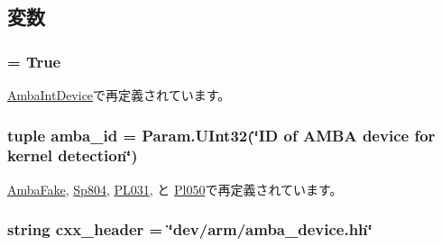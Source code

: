 \subsection{変数}
\hypertarget{classRealView_1_1AmbaPioDevice_a17fa61ac3806b481cafee5593b55e5d0}{
\subsubsection[{abstract}]{ = True}}
\label{classRealView_1_1AmbaPioDevice_a17fa61ac3806b481cafee5593b55e5d0}


\hyperlink{classRealView_1_1AmbaIntDevice_a17fa61ac3806b481cafee5593b55e5d0}{AmbaIntDevice}で再定義されています。\hypertarget{classRealView_1_1AmbaPioDevice_ad9d2b9e37de5c1c7c10219fc1b834599}{
\subsubsection[{amba\_\-id}]{\setlength{\rightskip}{0pt plus 5cm}tuple {\bf amba\_\-id} = Param.UInt32(\char`\"{}ID of AMBA device for kernel detection\char`\"{})}}
\label{classRealView_1_1AmbaPioDevice_ad9d2b9e37de5c1c7c10219fc1b834599}


\hyperlink{classRealView_1_1AmbaFake_a38d7b9edfe6f0eea7a54e7e4f6253f3a}{AmbaFake}, \hyperlink{classRealView_1_1Sp804_a38d7b9edfe6f0eea7a54e7e4f6253f3a}{Sp804}, \hyperlink{classRealView_1_1PL031_a38d7b9edfe6f0eea7a54e7e4f6253f3a}{PL031}, と \hyperlink{classRealView_1_1Pl050_a38d7b9edfe6f0eea7a54e7e4f6253f3a}{Pl050}で再定義されています。\hypertarget{classRealView_1_1AmbaPioDevice_a17da7064bc5c518791f0c891eff05fda}{
\subsubsection[{cxx\_\-header}]{\setlength{\rightskip}{0pt plus 5cm}string {\bf cxx\_\-header} = \char`\"{}dev/arm/amba\_\-device.hh\char`\"{}}}
\label{classRealView_1_1AmbaPioDevice_a17da7064bc5c518791f0c891eff05fda}


